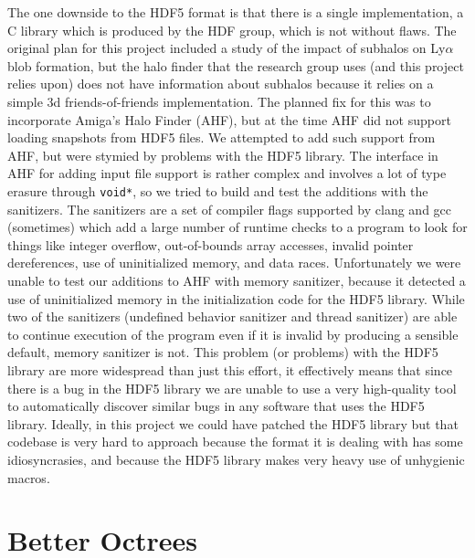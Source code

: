 The one downside to the HDF5 format is that there is a single implementation, a C library which is produced by the HDF group, which is not without flaws.
The original plan for this project included a study of the impact of subhalos on Ly$\alpha$ blob formation, but the halo finder that the research group uses (and this project relies upon) does not have information about subhalos because it relies on a simple 3d friends-of-friends implementation.
The planned fix for this was to incorporate Amiga's Halo Finder (AHF), but at the time AHF did not support loading snapshots from HDF5 files.
We attempted to add such support from AHF, but were stymied by problems with the HDF5 library.
The interface in AHF for adding input file support is rather complex and involves a lot of type erasure through \lstinline{void*}, so we tried to build and test the additions with the sanitizers.
The sanitizers are a set of compiler flags supported by clang and gcc (sometimes) which add a large number of runtime checks to a program to look for things like integer overflow, out-of-bounds array accesses, invalid pointer dereferences, use of uninitialized memory, and data races.
Unfortunately we were unable to test our additions to AHF with memory sanitizer, because it detected a use of uninitialized memory in the initialization code for the HDF5 library.
While two of the sanitizers (undefined behavior sanitizer and thread sanitizer) are able to continue execution of the program even if it is invalid by producing a sensible default, memory sanitizer is not.
This problem (or problems) with the HDF5 library are more widespread than just this effort, it effectively means that since there is a bug in the HDF5 library we are unable to use a very high-quality tool to automatically discover similar bugs in any software that uses the HDF5 library.
Ideally, in this project we could have patched the HDF5 library but that codebase is very hard to approach because the format it is dealing with has some idiosyncrasies, and because the HDF5 library makes very heavy use of unhygienic macros.

\section{Better Octrees}

